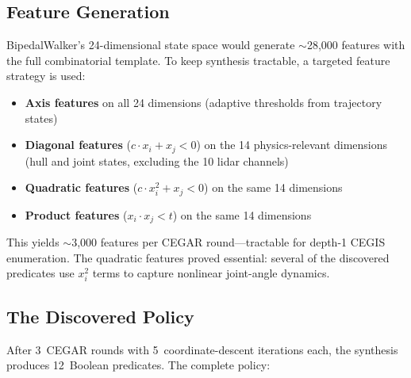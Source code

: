 \documentclass[9pt,a4paper]{article}
\theoremstyle{plain}
\theoremstyle{definition}
\theoremstyle{remark}
\begin{document}
\subsection{Feature Generation}

BipedalWalker's 24-dimensional state space would generate
$\sim$28,000 features with the full combinatorial template.
To keep synthesis tractable, a targeted feature strategy is used:

\begin{itemize}
\item \textbf{Axis features} on all 24 dimensions (adaptive
      thresholds from trajectory states)
\item \textbf{Diagonal features} ($c \cdot x_i + x_j < 0$) on the
      14 physics-relevant dimensions (hull and joint states,
      excluding the 10 lidar channels)
\item \textbf{Quadratic features} ($c \cdot x_i^2 + x_j < 0$) on
      the same 14 dimensions
\item \textbf{Product features} ($x_i \cdot x_j < t$) on the same
      14 dimensions
\end{itemize}

This yields $\sim$3,000 features per CEGAR round---tractable for
depth-1 CEGIS enumeration.  The quadratic features proved essential:
several of the discovered predicates use $x_i^2$ terms to capture
nonlinear joint-angle dynamics.

\subsection{The Discovered Policy}

After 3~CEGAR rounds with 5~coordinate-descent iterations each,
the synthesis produces 12~Boolean predicates.  The complete policy:
\end{document}
